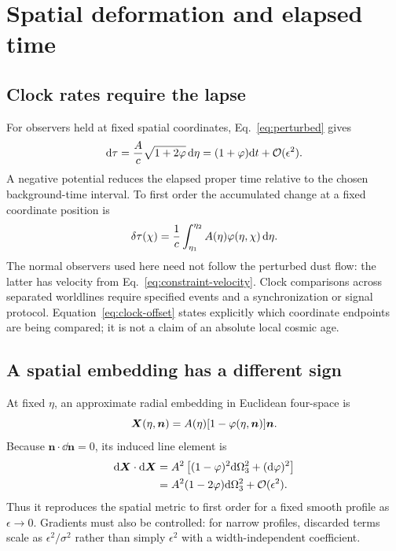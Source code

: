 \section{Spatial deformation and elapsed time}
\label{sec:geometry}
\subsection{Clock rates require the lapse}
For observers held at fixed spatial coordinates, Eq.~\eqref{eq:perturbed}
gives
\begin{equation}\label{eq:lapse}
 \mathrm{d}\tau=\frac{A}{c}\sqrt{1+2\varphi}\,\mathrm{d}\eta
 =(1+\varphi)\mathrm{d} t+\mathcal O(\epsilon^2).
\end{equation}
A negative potential reduces the elapsed proper time relative to the
chosen background-time interval. To first order the accumulated change
at a fixed coordinate position is
\begin{equation}\label{eq:clock-offset}
 \delta\tau(\chi)=\frac{1}{c}\int_{\eta_1}^{\eta_2}
 A(\eta)\varphi(\eta,\chi)\,\mathrm{d}\eta.
\end{equation}
The normal observers used here need not follow the perturbed dust flow:
the latter has velocity from Eq.~\eqref{eq:constraint-velocity}.
Clock comparisons across separated worldlines require specified events
and a synchronization or signal protocol. Equation~\eqref{eq:clock-offset}
states explicitly which coordinate endpoints are being compared; it is
not a claim of an absolute local cosmic age.

\subsection{A spatial embedding has a different sign}
At fixed $\eta$, an approximate radial embedding in Euclidean four-space is
\begin{equation}\label{eq:deformed-embedding}
 \bm X(\eta,\bm n)=A(\eta)[1-\varphi(\eta,\bm n)]\bm n.
\end{equation}
Because $\bm n\cdot\dd\bm n=0$, its induced line element is
\begin{align}
 \mathrm{d}\bm X\cdot\mathrm{d}\bm X
 &=A^2\left[(1-\varphi)^2\mathrm{d}\Omega_3^2+(\mathrm{d}\varphi)^2\right]\\
 &=A^2(1-2\varphi)\mathrm{d}\Omega_3^2+\mathcal O(\epsilon^2).
 \label{eq:induced}
\end{align}
Thus it reproduces the spatial metric to first order for a fixed smooth
profile as $\epsilon\to0$. Gradients must also be controlled: for narrow
profiles, discarded terms scale as $\epsilon^2/\sigma^2$ rather than
simply $\epsilon^2$ with a width-independent coefficient.


